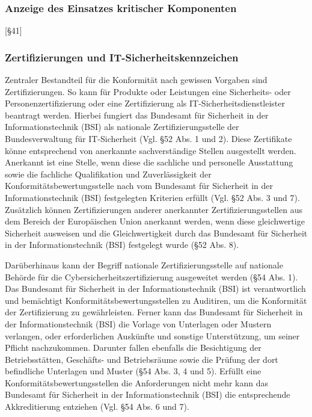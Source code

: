 \documentclass[11pt,a4paper]{article}   %
\begin{document}
        \subsubsection{Anzeige des Einsatzes kritischer Komponenten}

        [§41]

        \subsubsection{Zertifizierungen und IT-Sicherheitskennzeichen}
        Zentraler Bestandteil für die Konformität nach gewissen Vorgaben sind Zertifizierungen. So kann für Produkte oder Leistungen eine Sicherheits- oder Personenzertifizierung oder eine Zertifizierung als IT-Sicherheitsdienstleister beantragt werden. Hierbei fungiert das Bundesamt für Sicherheit in der Informationstechnik (BSI) als nationale Zertifizierungsstelle der Bundesverwaltung für IT-Sicherheit (Vgl. §52 Abs. 1 und 2). Diese Zertifikate könne entsprechend von anerkannte sachverständige Stellen ausgestellt werden. Anerkannt ist eine Stelle, wenn diese die sachliche und personelle Ausstattung sowie die fachliche Qualifikation und Zuverlässigkeit der Konformitätsbewertungsstelle nach vom Bundesamt für Sicherheit in der Informationstechnik (BSI) festgelegten Kriterien erfüllt (Vgl. §52 Abs. 3 und 7). Zusätzlich können Zertifizierungen anderer anerkannter Zertifizierungsstellen aus dem Bereich der Europäischen Union anerkannt werden, wenn diese gleichwertige Sicherheit ausweisen und die Gleichwertigkeit durch das Bundesamt für Sicherheit in der Informationstechnik (BSI) festgelegt wurde (§52 Abs. 8).

        Darüberhinaus kann der Begriff nationale Zertifizierungsstelle auf nationale Behörde für die Cybersicherheitszertifizierung ausgeweitet werden (§54 Abs. 1). Das Bundesamt für Sicherheit in der Informationstechnik (BSI) ist verantwortlich und bemächtigt Konformitätsbewertungsstellen zu Auditiren, um die Konformität der Zertifizierung zu gewährleisten. Ferner kann das Bundesamt für Sicherheit in der Informationstechnik (BSI) die Vorlage von Unterlagen oder Mustern verlangen, oder erforderlichen Auskünfte und sonstige Unterstützung, um seiner Pflicht nachzukommen. Darunter fallen ebenfalls die Besichtigung der Betriebsstätten, Geschäfts- und Betriebsräume sowie die Prüfung der dort befindliche Unterlagen und Muster (§54 Abs. 3, 4 und 5). Erfüllt eine Konformitätsbewertungsstellen die Anforderungen nicht mehr kann das Bundesamt für Sicherheit in der Informationstechnik (BSI) die entsprechende Akkreditierung entziehen (Vgl. §54 Abs. 6 und 7).
\end{document}

